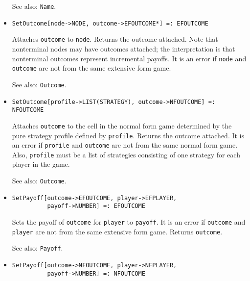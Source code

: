 \begin{itemize}
{\it for} {\tt T = ACTION, EFG, EFPLAYER, INFOSET, NFG, NFOUTCOME, 
NFPLAYER, NODE, EFOUTCOME, STRATEGY}
\bd
Sets the name of \verb+x+ to \verb+name+.  Returns \verb+x+.
\item [See also:] \verb+Name+.
\ed

\item{}
\protect \large \begin{verbatim} 
SetOutcome[node->NODE, outcome->EFOUTCOME*] =: EFOUTCOME 
\end{verbatim}\normalsize

\bd
Attaches \verb+outcome+ to \verb+node+.  Returns the outcome attached.
Note that nonterminal nodes may have outcomes attached; the interpretation
is that nonterminal outcomes represent incremental payoffs.  
It is an error if \verb+node+ and \verb+outcome+ are not from the same
extensive form game.
\item [See also:] \verb+Outcome+.
\ed

\item{}
\protect \large \begin{verbatim} 
SetOutcome[profile->LIST(STRATEGY), outcome->NFOUTCOME] =: NFOUTCOME 
\end{verbatim}\normalsize

\bd 
Attaches \verb+outcome+ to the cell in the normal form game
determined by the pure strategy profile defined by \verb+profile+.
Returns the outcome attached.  It is an error if \verb+profile+ and
\verb+outcome+ are not from the same normal form game. Also,
\verb+profile+ must be a list of strategies consisting of one strategy
for each player in the game.  
\item [See also:] \verb+Outcome+.
\ed

\item{}
\protect \large \begin{verbatim}
SetPayoff[outcome->EFOUTCOME, player->EFPLAYER,
          payoff->NUMBER] =: EFOUTCOME 
\end{verbatim}\normalsize

\bd
Sets the payoff of \verb+outcome+ for \verb+player+ to \verb+payoff+.
It is an error if \verb+outcome+ and \verb+player+ are not from the
same extensive form game.  Returns \verb+outcome+.
\item [See also:] \verb+Payoff+.
\ed

\item{}
\protect \large \begin{verbatim}
SetPayoff[outcome->NFOUTCOME, player->NFPLAYER, 
          payoff->NUMBER] =: NFOUTCOME 
\end{verbatim}\normalsize


\end{itemize}
